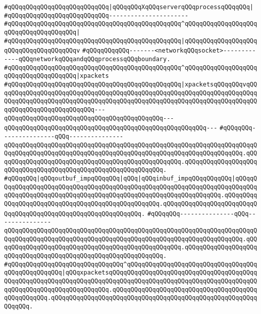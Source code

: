 \verb|#qQQqqQQqqQQqqQQqqQQqqQQqqQQq|\verb#|qQQqqQQqXqQQqserverqQQqprocessqQQqqQQq|#\newline
\verb|#qQQqqQQqqQQqqQQqqQQqqQQqqQQq----------------------|\newline
\verb|#qQQqqQQqqQQqqQQqqQQqqQQqqQQqqQQqqQQqqQQqqQQqqQQq^qQQqqQQqqQQqqQQqqQQqqQQqqQQqqQQqqQQqqQQq|\verb#|#\newline
\verb|#qQQqqQQqqQQqqQQqqQQqqQQqqQQqqQQqqQQqqQQqqQQqqQQq|\verb#|qQQqqQQqqQQqqQQqqQQqqQQqqQQqqQQqqQQqqQQqv#\newline
\verb|#qQQqqQQqqQQq-------<networkqQQqsocket>-------------qQQqnetworkqQQqandqQQqprocessqQQqboundary.|\newline
\verb|#qQQqqQQqqQQqqQQqqQQqqQQqqQQqqQQqqQQqqQQqqQQqqQQq^qQQqqQQqqQQqqQQqqQQqqQQqqQQqqQQqqQQqqQQq|\verb#|xpackets#\newline
\verb|#qQQqqQQqqQQqqQQqqQQqqQQqqQQqqQQqqQQqqQQqqQQqqQQq|\verb#|xpacketsqQQqqQQqvqQQqqQQqqQQqqQQqqQQqqQQqqQQqqQQqqQQqqQQqqQQqqQQqqQQqqQQqqQQqqQQqqQQqqQQqqQQqqQQqqQQqqQQqqQQqqQQqqQQqqQQqqQQqqQQqqQQqqQQqqQQqqQQqqQQqqQQqqQQqqQQqqQQqqQQqqQQqqQQqqQQqqQQq---qQQqqQQqqQQqqQQqqQQqqQQqqQQqqQQqqQQqqQQqqQQq---qQQqqQQqqQQqqQQqqQQqqQQqqQQqqQQqqQQqqQQqqQQqqQQqqQQqqQQq---#\newline
\verb|#qQQqqQQq---------------qQQq---------------qQQqqQQqqQQqqQQqqQQqqQQqqQQqqQQqqQQqqQQqqQQqqQQqqQQqqQQqqQQqqQQqqQQqqQQqqQQqqQQqqQQqqQQqqQQqqQQqqQQqqQQqqQQqqQQqqQQqqQQqqQQqqQQqqQQqqQQq.qQQqqQQqqQQqqQQqqQQqqQQqqQQqqQQqqQQqqQQqqQQqqQQqqQQq.qQQqqQQqqQQqqQQqqQQqqQQqqQQqqQQqqQQqqQQqqQQqqQQqqQQqqQQqqQQqqQQq.|\newline
\verb|#qQQqqQQq|\verb#|qQQqoutbuf_impqQQqqQQq|qQQq|qQQqinbuf_impqQQqqQQqqQQq|qQQqqQQqqQQqqQQqqQQqqQQqqQQqqQQqqQQqqQQqqQQqqQQqqQQqqQQqqQQqqQQqqQQqqQQqqQQqqQQqqQQqqQQqqQQqqQQqqQQqqQQqqQQqqQQqqQQqqQQqqQQqqQQqqQQqqQQq.qQQqqQQqqQQqqQQqqQQqqQQqqQQqqQQqqQQqqQQqqQQqqQQqqQQq.qQQqqQQqqQQqqQQqqQQqqQQqqQQqqQQqqQQqqQQqqQQqqQQqqQQqqQQqqQQqqQQq.#\newline
\verb|#qQQqqQQq---------------qQQq---------------qQQqqQQqqQQqqQQqqQQqqQQqqQQqqQQqqQQqqQQqqQQqqQQqqQQqqQQqqQQqqQQqqQQqqQQqqQQqqQQqqQQqqQQqqQQqqQQqqQQqqQQqqQQqqQQqqQQqqQQqqQQqqQQqqQQqqQQq.qQQqqQQqqQQqqQQqqQQqqQQqqQQqqQQqqQQqqQQqqQQqqQQqqQQq.qQQqqQQqqQQqqQQqqQQqqQQqqQQqqQQqqQQqqQQqqQQqqQQqqQQqqQQqqQQqqQQq.|\newline
\verb|#qQQqqQQqqQQqqQQqqQQqqQQqqQQqqQQq^qQQqqQQqqQQqqQQqqQQqqQQqqQQqqQQqqQQqqQQqqQQqqQQqqQQq|\verb#|qQQqxpacketsqQQqqQQqqQQqqQQqqQQqqQQqqQQqqQQqqQQqqQQqqQQqqQQqqQQqqQQqqQQqqQQqqQQqqQQqqQQqqQQqqQQqqQQqqQQqqQQqqQQqqQQqqQQqqQQqqQQqqQQqqQQqqQQqqQQqqQQqqQQq.qQQqqQQqqQQqqQQqqQQqqQQqqQQqqQQqqQQqqQQqqQQqqQQqqQQq.qQQqqQQqqQQqqQQqqQQqqQQqqQQqqQQqqQQqqQQqqQQqqQQqqQQqqQQqqQQqqQQq.#\newline

